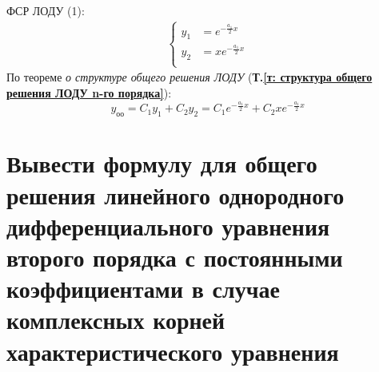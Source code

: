 ФСР ЛОДУ (1):
\begin{gather*}
    \left\{ \begin{aligned}
        y_1 &= e^{-\tfrac{a_1}{2}x} \\
        y_2 &= xe^{-\tfrac{a_1}{2}x} \\
    \end{aligned} \right.
\end{gather*}
По теореме \textit{о структуре общего решения ЛОДУ} (\textbf{Т.\ref{т: структура общего решения ЛОДУ n-го порядка}}):
\[
    y_{\text{оо}} = C_1y_1 + C_2y_2 = C_1 e^{-\tfrac{a_1}{2}x} + C_2 xe^{-\tfrac{a_1}{2}x}
\]

\section{Вывести формулу для общего решения линейного однородного дифференциального уравнения второго порядка с постоянными коэффициентами в случае комплексных корней характеристического уравнения}

